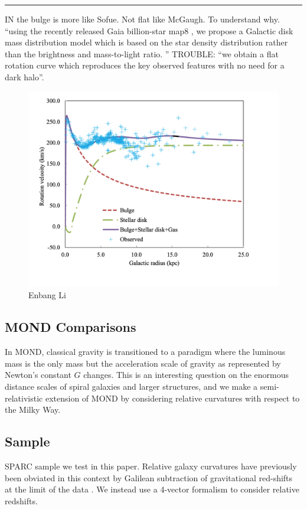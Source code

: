\documentclass[reprint,%
 amsmath,amssymb,
 aps,
]{revtex4-1}
\begin{document}
{\color{red} \rule{\linewidth}{0.5mm}}



IN \cite{Li2016ModellingMD} the bulge is more like Sofue. Not flat like McGaugh. 
To understand why. 
``using the recently released Gaia billion-star map8
, we propose a
Galactic disk mass distribution model which is based on the star density distribution
rather than the brightness and mass-to-light ratio. ''
TROUBLE: ``we obtain a flat rotation curve
which reproduces the key observed features with no need for a dark halo''.

\begin{figure}
    \centering
    \includegraphics{MW_Enbang_Li}
    \caption{Enbang Li \cite{Li2016ModellingMD}}
    \label{fig:my_label}
\end{figure}

\subsection{MOND Comparisons}


 In MOND,  classical gravity is transitioned to  a paradigm where the luminous mass is the only mass  but    the acceleration scale of gravity as represented by  Newton's  constant $G$ changes. This is an  interesting    question   on the enormous distance scales of spiral galaxies and larger structures, and we make a semi-relativistic extension of MOND 
 by considering relative curvatures with respect to the Milky Way. 
 \subsection{Sample}
 SPARC sample we test in this paper.   Relative galaxy curvatures have previously been   obviated in this context by Galilean subtraction of   gravitational red-shifts at the    limit of the data  \citep{MTW}. We instead use a 4-vector formalism to consider relative redshifts.  
\end{document}
